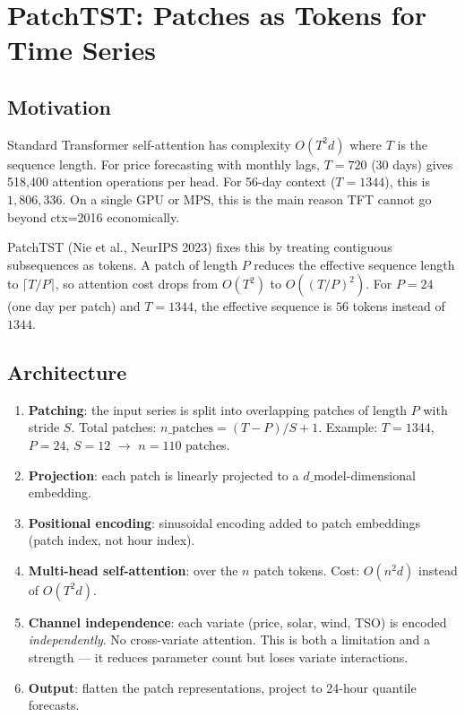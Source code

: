 \section{PatchTST: Patches as Tokens for Time Series}

\subsection{Motivation}

Standard Transformer self-attention has complexity $O(T^2 d)$ where $T$
is the sequence length. For price forecasting with monthly lags, $T=720$
(30 days) gives 518,400 attention operations per head. For 56-day context
($T=1344$), this is $1{,}806{,}336$. On a single GPU or MPS, this is the
main reason TFT cannot go beyond ctx=2016 economically.

PatchTST (Nie et al., NeurIPS 2023) fixes this by treating contiguous
subsequences as tokens. A patch of length $P$ reduces the effective
sequence length to $\lceil T/P \rceil$, so attention cost drops from
$O(T^2)$ to $O((T/P)^2)$. For $P=24$ (one day per patch) and $T=1344$,
the effective sequence is $56$ tokens instead of $1344$.

\subsection{Architecture}

\begin{enumerate}
  \item \textbf{Patching}: the input series is split into overlapping
        patches of length $P$ with stride $S$.
        Total patches: $n\_\text{patches} = (T - P) / S + 1$.
        Example: $T=1344$, $P=24$, $S=12$ $\to$ $n = 110$ patches.
  \item \textbf{Projection}: each patch is linearly projected to a
        $d\_\text{model}$-dimensional embedding.
  \item \textbf{Positional encoding}: sinusoidal encoding added to
        patch embeddings (patch index, not hour index).
  \item \textbf{Multi-head self-attention}: over the $n$ patch tokens.
        Cost: $O(n^2 d)$ instead of $O(T^2 d)$.
  \item \textbf{Channel independence}: each variate (price, solar,
        wind, TSO) is encoded \emph{independently}. No cross-variate
        attention. This is both a limitation and a strength --- it
        reduces parameter count but loses variate interactions.
  \item \textbf{Output}: flatten the patch representations, project
        to 24-hour quantile forecasts.
\end{enumerate}

